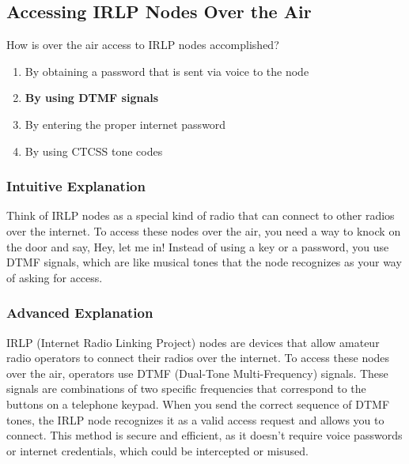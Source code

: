 \subsection{Accessing IRLP Nodes Over the Air}
\label{T8C06}

\begin{tcolorbox}[colback=gray!10!white,colframe=black!75!black,title=T8C06]
How is over the air access to IRLP nodes accomplished?
\begin{enumerate}[noitemsep]
    \item By obtaining a password that is sent via voice to the node
    \item \textbf{By using DTMF signals}
    \item By entering the proper internet password
    \item By using CTCSS tone codes
\end{enumerate}
\end{tcolorbox}

\subsubsection*{Intuitive Explanation}
Think of IRLP nodes as a special kind of radio that can connect to other radios over the internet. To access these nodes over the air, you need a way to knock on the door and say, Hey, let me in! Instead of using a key or a password, you use DTMF signals, which are like musical tones that the node recognizes as your way of asking for access.

\subsubsection*{Advanced Explanation}
IRLP (Internet Radio Linking Project) nodes are devices that allow amateur radio operators to connect their radios over the internet. To access these nodes over the air, operators use DTMF (Dual-Tone Multi-Frequency) signals. These signals are combinations of two specific frequencies that correspond to the buttons on a telephone keypad. When you send the correct sequence of DTMF tones, the IRLP node recognizes it as a valid access request and allows you to connect. This method is secure and efficient, as it doesn't require voice passwords or internet credentials, which could be intercepted or misused.